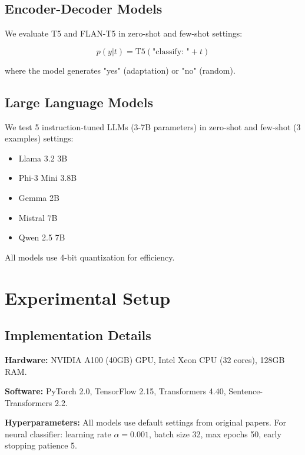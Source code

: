 \documentclass[11pt,a4paper]{article}
\begin{document}
\subsection{Encoder-Decoder Models}

We evaluate T5 \cite{Raffel2020T5} and FLAN-T5 \cite{Chung2022FLAN} in zero-shot and few-shot settings:

\begin{equation}
p(y | t) = \text{T5}(\text{"classify: "} + t)
\end{equation}

where the model generates "yes" (adaptation) or "no" (random).

\subsection{Large Language Models}

We test 5 instruction-tuned LLMs (3-7B parameters) in zero-shot and few-shot (3 examples) settings:

\begin{itemize}
    \item Llama 3.2 3B \cite{MetaAI2024Llama}
    \item Phi-3 Mini 3.8B \cite{Microsoft2024Phi3}
    \item Gemma 2B \cite{Google2024Gemma}
    \item Mistral 7B \cite{Jiang2023Mistral}
    \item Qwen 2.5 7B \cite{Alibaba2024Qwen}
\end{itemize}

All models use 4-bit quantization \cite{Dettmers2023QLoRA} for efficiency.

\section{Experimental Setup}

\subsection{Implementation Details}

\textbf{Hardware:} NVIDIA A100 (40GB) GPU, Intel Xeon CPU (32 cores), 128GB RAM.

\textbf{Software:} PyTorch 2.0, TensorFlow 2.15, Transformers 4.40, Sentence-Transformers 2.2.

\textbf{Hyperparameters:} All models use default settings from original papers. For neural classifier: learning rate $\alpha=0.001$, batch size 32, max epochs 50, early stopping patience 5.
\end{document}
